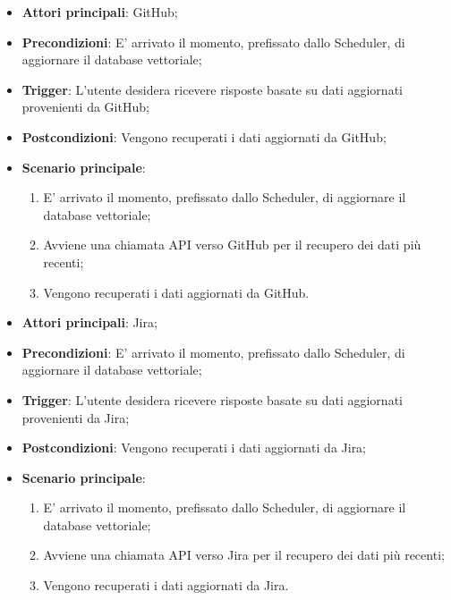 \hypertarget{UC11.1}{}
\begin{itemize}
    \item \textbf{Attori principali}: GitHub;
    \item \textbf{Precondizioni}: E' arrivato il momento, prefissato dallo Scheduler, di aggiornare il database vettoriale;
    \item \textbf{Trigger}: L'utente desidera ricevere risposte basate su dati aggiornati provenienti da GitHub;
    \item \textbf{Postcondizioni}: Vengono recuperati i dati aggiornati da GitHub;
    \item \textbf{Scenario principale}: 
    \begin{enumerate}
        \item E' arrivato il momento, prefissato dallo Scheduler, di aggiornare il database vettoriale;
        \item Avviene una chiamata API verso GitHub per il recupero dei dati più recenti;
        \item Vengono recuperati i dati aggiornati da GitHub.
    \end{enumerate}
\end{itemize}

\hypertarget{UC11.2}{}
\begin{itemize}
    \item \textbf{Attori principali}: Jira;
    \item \textbf{Precondizioni}: E' arrivato il momento, prefissato dallo Scheduler, di aggiornare il database vettoriale;
    \item \textbf{Trigger}: L'utente desidera ricevere risposte basate su dati aggiornati provenienti da Jira;
    \item \textbf{Postcondizioni}: Vengono recuperati i dati aggiornati da Jira;
    \item \textbf{Scenario principale}: 
    \begin{enumerate}
        \item E' arrivato il momento, prefissato dallo Scheduler, di aggiornare il database vettoriale;
        \item Avviene una chiamata API verso Jira per il recupero dei dati più recenti;
        \item Vengono recuperati i dati aggiornati da Jira.
    \end{enumerate}
\end{itemize}

